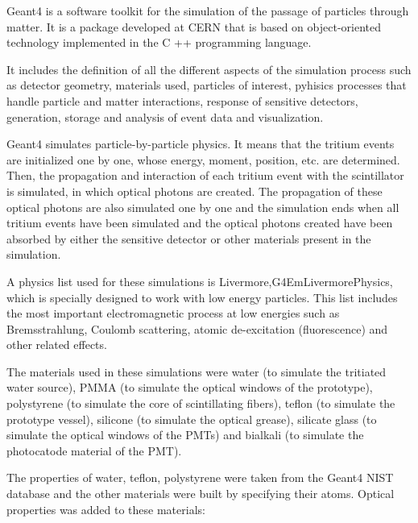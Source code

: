 Geant4 is a software toolkit for the simulation of the passage of particles through matter. It is a package developed at CERN that is based on object-oriented technology implemented in the C ++ programming language.

It includes the definition of all the different aspects of the simulation process such as detector geometry, materials used, particles of interest, pyhisics processes that handle particle and matter interactions, response of sensitive detectors, generation, storage and analysis of event data and visualization.

Geant4 simulates particle-by-particle physics. It means that the tritium events are initialized one by one, whose energy, moment, position, etc. are determined. Then, the propagation and interaction of each tritium event with the scintillator is simulated, in which optical photons are created. The propagation of these optical photons are also simulated one by one and the simulation ends when all tritium events have been simulated and the optical photons created have been absorbed by either the sensitive detector or other materials present in the simulation.

A physics list used for these simulations is Livermore,\newline G4EmLivermorePhysics, which is specially designed to work with low energy particles. This list includes the most important electromagnetic process at low energies such as Bremsstrahlung, Coulomb scattering, atomic de-excitation (fluorescence) and other related effects.

The materials used in these simulations were water (to simulate the tritiated water source), PMMA (to simulate the optical windows of the prototype), polystyrene (to simulate the core of scintillating fibers), teflon (to simulate the prototype vessel), silicone (to simulate the optical grease), silicate glass (to simulate the optical windows of the PMTs) and bialkali (to simulate the photocatode material of the PMT).

The properties of water, teflon, polystyrene were taken from the Geant4 NIST database and the other materials were built by specifying their atoms. Optical properties was added to these materials:

